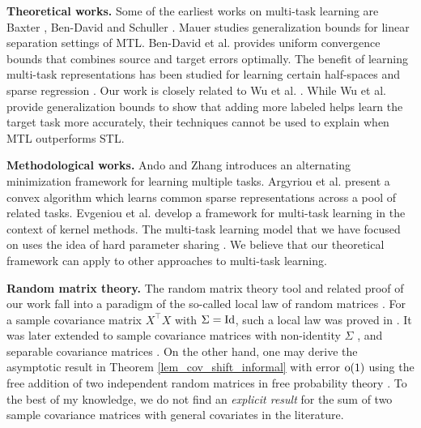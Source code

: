 \medskip
\noindent\textbf{Theoretical works.}
Some of the earliest works on multi-task learning are Baxter \cite{B00}, Ben-David and Schuller \cite{BS03}.
Mauer \cite{M06} studies generalization bounds for linear separation settings of MTL.
Ben-David et al. \cite{BBCK10} provides uniform convergence bounds that combines source and target errors optimally.
The benefit of learning multi-task representations has been studied for learning certain half-spaces \cite{MPR16} and sparse regression \cite{LPTV09,LPVT11}.
Our work is closely related to Wu et al. \cite{WZR20}.
While Wu et al. provide generalization bounds to show that adding more labeled helps learn the target task more accurately, their techniques cannot be used to explain when MTL outperforms STL.

\medskip
\noindent\textbf{Methodological works.}
Ando and Zhang \cite{AZ05} introduces an alternating minimization framework for learning multiple tasks.
Argyriou et al. \cite{AEP08} present a convex algorithm which learns common sparse representations across a pool of related tasks.
Evgeniou et al. \cite{EMP05} develop a framework for multi-task learning in the context of kernel methods.
The multi-task learning model that we have focused on uses the idea of hard parameter sharing \cite{C93,KD12,R17}.
We believe that our theoretical framework can apply to other approaches to multi-task learning.

\medskip
\noindent\textbf{Random matrix theory.}
The random matrix theory tool and related proof of our work fall into a paradigm of the so-called local law of random matrices \cite{erdos2017dynamical}.
For a sample covariance matrix $X^\top X$ with $\Sigma=\operatorname{Id}$, such a local law was proved in \cite{isotropic}.
It was later extended to sample covariance matrices with non-identity $\Sigma$ \cite{Anisotropic}, and separable covariance matrices \cite{yang2019spiked}. On the other hand, one may derive the asymptotic result in Theorem \ref{lem_cov_shift_informal} with error $\operatorname{o}(1)$ using the free addition of two independent random matrices in free probability theory \cite{nica2006lectures}. To the best of my knowledge, we do not find an {\it explicit result} for the sum of two sample covariance matrices with general covariates in the literature.



